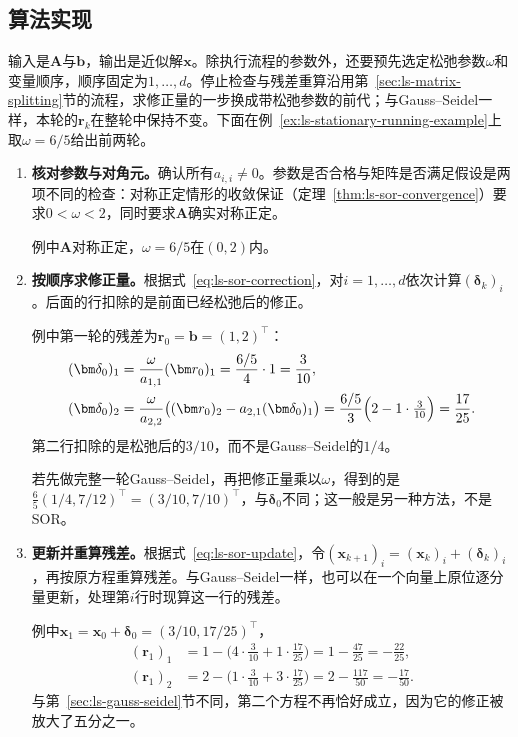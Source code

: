 \subsection{算法实现}

输入是$\bm A$与$\bm b$，输出是近似解$\bm x$。除执行流程的参数外，还要预先选定松弛参数$\omega$和变量顺序，顺序固定为$1,\ldots,d$。停止检查与残差重算沿用第~\ref{sec:ls-matrix-splitting}节的流程，求修正量的一步换成带松弛参数的前代；与Gauss--Seidel一样，本轮的$\bm r_k$在整轮中保持不变。下面在例~\ref{ex:ls-stationary-running-example}上取$\omega=6/5$给出前两轮。
\begin{enumerate}
 \item \textbf{核对参数与对角元。}确认所有$a_{i,i}\neq0$。参数是否合格与矩阵是否满足假设是两项不同的检查：对称正定情形的收敛保证（定理~\ref{thm:ls-sor-convergence}）要求$0<\omega<2$，同时要求$\bm A$确实对称正定。

 例中$\bm A$对称正定，$\omega=6/5$在$(0,2)$内。

 \item \textbf{按顺序求修正量。}根据式~\eqref{eq:ls-sor-correction}，对$i=1,\ldots,d$依次计算$(\bm\delta_k)_i$。后面的行扣除的是前面已经松弛后的修正。

 例中第一轮的残差为$\bm r_0=\bm b=(1,2)^\top$：
 \[
  \begin{aligned}
  (\bm\delta_0)_1&=\frac{\omega}{a_{1,1}}(\bm r_0)_1=\frac{6/5}{4}\cdot1=\frac3{10},\\
  (\bm\delta_0)_2&=\frac{\omega}{a_{2,2}}\bigl((\bm r_0)_2-a_{2,1}(\bm\delta_0)_1\bigr)=\frac{6/5}{3}\Bigl(2-1\cdot\tfrac3{10}\Bigr)=\frac{17}{25} .
  \end{aligned}
 \]
 第二行扣除的是松弛后的$3/10$，而不是Gauss--Seidel的$1/4$。

 若先做完整一轮Gauss--Seidel，再把修正量乘以$\omega$，得到的是$\tfrac65(1/4,7/12)^\top=(3/10,7/10)^\top$，与$\bm\delta_0$不同；这一般是另一种方法，不是SOR。

 \item \textbf{更新并重算残差。}根据式~\eqref{eq:ls-sor-update}，令$(\bm x_{k+1})_i=(\bm x_k)_i+(\bm\delta_k)_i$，再按原方程重算残差。与Gauss--Seidel一样，也可以在一个向量上原位逐分量更新，处理第$i$行时现算这一行的残差。

 例中$\bm x_1=\bm x_0+\bm\delta_0=(3/10,17/25)^\top$，
 \[
  \begin{aligned}
  (\bm r_1)_1&=1-\bigl(4\cdot\tfrac3{10}+1\cdot\tfrac{17}{25}\bigr)=1-\tfrac{47}{25}=-\tfrac{22}{25},\\
  (\bm r_1)_2&=2-\bigl(1\cdot\tfrac3{10}+3\cdot\tfrac{17}{25}\bigr)=2-\tfrac{117}{50}=-\tfrac{17}{50} .
  \end{aligned}
 \]
 与第~\ref{sec:ls-gauss-seidel}节不同，第二个方程不再恰好成立，因为它的修正被放大了五分之一。


\end{enumerate}
